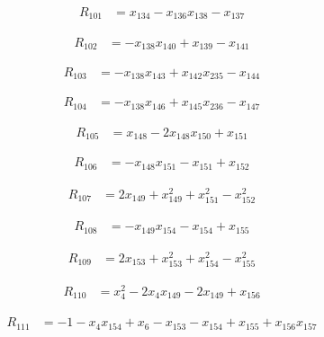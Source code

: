 \documentclass[11pt,letterpaper]{article}
\theoremstyle{definition}
\theoremstyle{remark}
\begin{document}
\begin{align*}
R_{101} &= x_{134} -x_{136} x_{138} -x_{137}
\end{align*}

\begin{align*}
R_{102} &= -x_{138} x_{140} +x_{139} -x_{141}
\end{align*}

\begin{align*}
R_{103} &= -x_{138} x_{143} +x_{142} x_{235} -x_{144}
\end{align*}

\begin{align*}
R_{104} &= -x_{138} x_{146} +x_{145} x_{236} -x_{147}
\end{align*}

\begin{align*}
R_{105} &= x_{148} -2 x_{148} x_{150} +x_{151}
\end{align*}

\begin{align*}
R_{106} &= -x_{148} x_{151} -x_{151} +x_{152}
\end{align*}

\begin{align*}
R_{107} &= 2 x_{149} +x_{149}^{2} +x_{151}^{2} -x_{152}^{2}
\end{align*}

\begin{align*}
R_{108} &= -x_{149} x_{154} -x_{154} +x_{155}
\end{align*}

\begin{align*}
R_{109} &= 2 x_{153} +x_{153}^{2} +x_{154}^{2} -x_{155}^{2}
\end{align*}

\begin{align*}
R_{110} &= x_{4}^{2} -2 x_{4} x_{149} -2 x_{149} +x_{156}
\end{align*}

\begin{align*}
R_{111} &= -1 -x_{4} x_{154} +x_{6} -x_{153} -x_{154} +x_{155} +x_{156} x_{157}
\end{align*}
\end{document}
